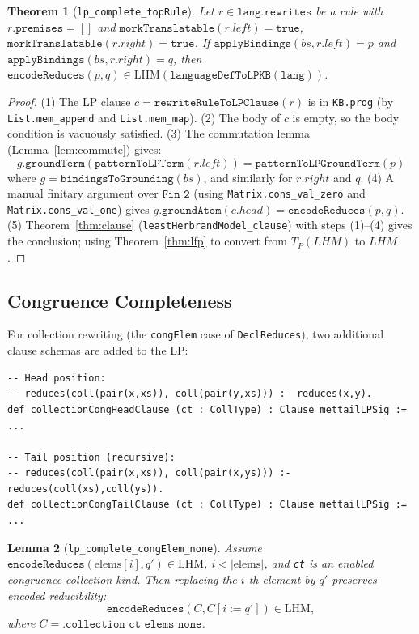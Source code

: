 \documentclass[]{article}
\newtheorem{theorem}{Theorem}
\newtheorem{lemma}[theorem]{Lemma}
\newcommand{\code}[1]{\texttt{#1}}
\begin{document}
\begin{theorem}[\code{lp\_complete\_topRule}]
\label{thm:topRule}
Let $r \in \code{lang.rewrites}$ be a rule with $r.\code{premises} = []$
and $\code{morkTranslatable}(r.left) = \code{true}$,
$\code{morkTranslatable}(r.right) = \code{true}$.
If $\code{applyBindings}(bs, r.left) = p$ and
$\code{applyBindings}(bs, r.right) = q$,
then
$\code{encodeReduces}(p, q) \in \mathrm{LHM}(\code{languageDefToLPKB}(\code{lang}))$.
\end{theorem}

\begin{proof}
(1) The LP clause $c = \code{rewriteRuleToLPClause}(r)$ is in \code{KB.prog}
(by \code{List.mem\_append} and \code{List.mem\_map}).
(2) The body of $c$ is empty, so the body condition is vacuously satisfied.
(3) The commutation lemma (Lemma~\ref{lem:commute}) gives:
\[
  g.\code{groundTerm}(\code{patternToLPTerm}(r.left)) = \code{patternToLPGroundTerm}(p)
\]
where $g = \code{bindingsToGrounding}(bs)$, and similarly for $r.right$ and $q$.
(4) A manual finitary argument over $\code{Fin 2}$ (using
\code{Matrix.cons\_val\_zero} and \code{Matrix.cons\_val\_one}) gives
$g.\code{groundAtom}(c.head) = \code{encodeReduces}(p, q)$.
(5) Theorem~\ref{thm:clause} (\code{leastHerbrandModel\_clause}) with steps (1)--(4)
gives the conclusion; using Theorem~\ref{thm:lfp} to convert from $T_P(LHM)$ to $LHM$.
\end{proof}

\subsection{Congruence Completeness}

For collection rewriting (the \code{congElem} case of \code{DeclReduces}),
two additional clause schemas are added to the LP:

\begin{lstlisting}[language=lean]
-- Head position:
-- reduces(coll(pair(x,xs)), coll(pair(y,xs))) :- reduces(x,y).
def collectionCongHeadClause (ct : CollType) : Clause mettailLPSig := ...

-- Tail position (recursive):
-- reduces(coll(pair(x,xs)), coll(pair(x,ys))) :- reduces(coll(xs),coll(ys)).
def collectionCongTailClause (ct : CollType) : Clause mettailLPSig := ...
\end{lstlisting}

\begin{lemma}[\code{lp\_complete\_congElem\_none}]
\label{lem:cong}
Assume $\code{encodeReduces}(\text{elems}[i], q') \in \mathrm{LHM}$,
$i < |\text{elems}|$, and \code{ct} is an enabled congruence collection kind.
Then replacing the $i$-th element by $q'$ preserves encoded reducibility:
\[
  \code{encodeReduces}(C, C[i := q']) \in \mathrm{LHM},
\]
where $C = \code{.collection ct elems none}$.
\end{lemma}
\end{document}
